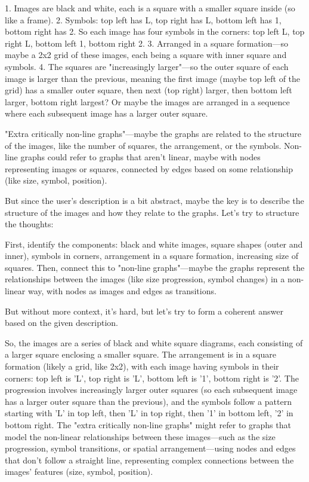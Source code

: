 1. Images are black and white, each is a square with a smaller square inside (so like a frame).
2. Symbols: top left has L, top right has L, bottom left has 1, bottom right has 2. So each image has four symbols in the corners: top left L, top right L, bottom left 1, bottom right 2.
3. Arranged in a square formation—so maybe a 2x2 grid of these images, each being a square with inner square and symbols.
4. The squares are "increasingly larger"—so the outer square of each image is larger than the previous, meaning the first image (maybe top left of the grid) has a smaller outer square, then next (top right) larger, then bottom left larger, bottom right largest? Or maybe the images are arranged in a sequence where each subsequent image has a larger outer square.

"Extra critically non-line graphs"—maybe the graphs are related to the structure of the images, like the number of squares, the arrangement, or the symbols. Non-line graphs could refer to graphs that aren't linear, maybe with nodes representing images or squares, connected by edges based on some relationship (like size, symbol, position).

But since the user's description is a bit abstract, maybe the key is to describe the structure of the images and how they relate to the graphs. Let's try to structure the thoughts:

First, identify the components: black and white images, square shapes (outer and inner), symbols in corners, arrangement in a square formation, increasing size of squares. Then, connect this to "non-line graphs"—maybe the graphs represent the relationships between the images (like size progression, symbol changes) in a non-linear way, with nodes as images and edges as transitions.

But without more context, it's hard, but let's try to form a coherent answer based on the given description.

So, the images are a series of black and white square diagrams, each consisting of a larger square enclosing a smaller square. The arrangement is in a square formation (likely a grid, like 2x2), with each image having symbols in their corners: top left is 'L', top right is 'L', bottom left is '1', bottom right is '2'. The progression involves increasingly larger outer squares (so each subsequent image has a larger outer square than the previous), and the symbols follow a pattern starting with 'L' in top left, then 'L' in top right, then '1' in bottom left, '2' in bottom right. The "extra critically non-line graphs" might refer to graphs that model the non-linear relationships between these images—such as the size progression, symbol transitions, or spatial arrangement—using nodes and edges that don't follow a straight line, representing complex connections between the images' features (size, symbol, position).

